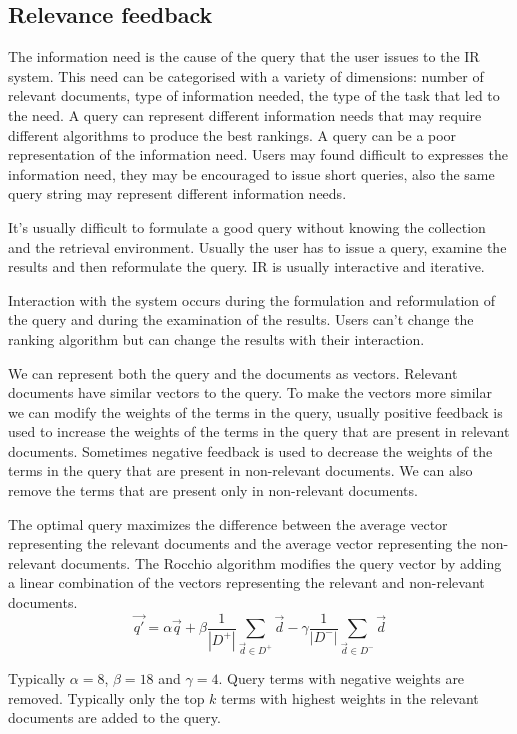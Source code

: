 \subsection{Relevance feedback}
\label{sec:relevance_feedback}

The information need is the cause of the query
that the user issues to the IR system.
This need can be categorised with a variety of
dimensions: number of relevant documents, type 
of information needed, the type of the task
that led to the need.
A query can represent different information needs
that may require different algorithms to produce
the best rankings.
A query can be a poor representation of the
information need. Users may found difficult to
expresses the information need, they may be
encouraged to issue short queries, also the
same query string may represent different
information needs.

It's usually difficult to formulate a good query
without knowing the collection and the retrieval
environment. Usually the user has to issue a
query, examine the results and then reformulate
the query. IR is usually interactive and iterative.

Interaction with the system occurs during the
formulation and reformulation of the query and 
during the examination of the results.
Users can't change the ranking algorithm but can 
change the results with their interaction.

We can represent both the query and the documents as
vectors. Relevant documents have similar vectors to
the query. To make the vectors more similar we can
modify the weights of the terms in the query,
usually positive feedback is used to increase the
weights of the terms in the query that are present
in relevant documents. Sometimes negative
feedback is used to decrease the weights of the
terms in the query that are present in non-relevant
documents. We can also remove the terms that are
present only in non-relevant documents.

The optimal query maximizes the difference between
the average vector representing the relevant
documents and the average vector representing the
non-relevant documents. The Rocchio algorithm
modifies the query vector by adding a linear
combination of the vectors representing the
relevant and non-relevant documents.
\[
    \vec{q'}=\alpha\vec{q}+\beta\frac{1}{|D^+|}\sum_{\vec{d}\in D^+}\vec{d}
        -\gamma\frac{1}{|D^-|}\sum_{\vec{d}\in D^-}\vec{d}
\]

Typically $\alpha=8$, $\beta=18$ and $\gamma=4$.
Query terms with negative weights are removed.
Typically only the top $k$ terms with highest weights
in the relevant documents are added to the query.

